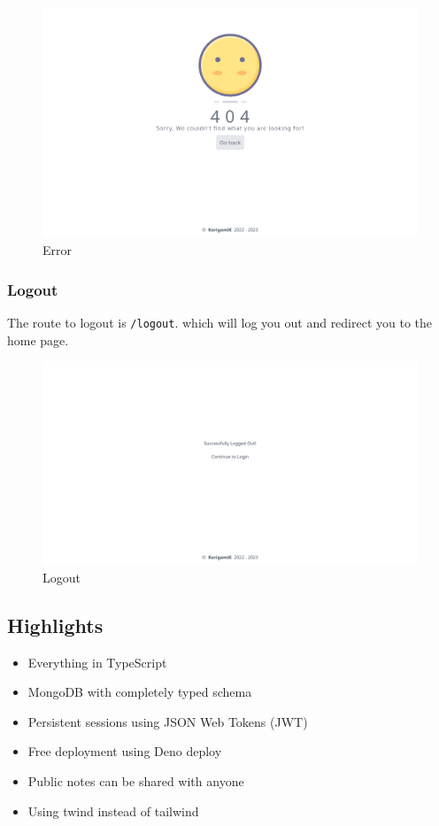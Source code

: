 \documentclass[
]{article}
\providecommand{\tightlist}{%
  \setlength{\itemsep}{0pt}\setlength{\parskip}{0pt}}
\begin{document}
\begin{figure}[!h]
  \centering
  \includegraphics{../.github/images/error.png}
  \caption{Error}
\end{figure}

\hypertarget{Logout}{%
  \subsubsection{Logout}\label{Logout}
  The route to logout is \texttt{/logout}. which will log you out and redirect you to the home page.
}

\begin{figure}[!h]
  \centering
  \includegraphics{../.github/images/logout.png}
  \caption{Logout}
\end{figure}

\hypertarget{highlights}{%
  \subsection{Highlights}\label{highlights}}

\begin{itemize}
  \tightlist
  \item
        Everything in TypeScript
  \item
        MongoDB with completely typed schema
  \item
        Persistent sessions using JSON Web Tokens (JWT)
  \item
        Free deployment using Deno deploy
  \item
        Public notes can be shared with anyone
  \item
        Using twind instead of tailwind
\end{itemize}
\end{document}
